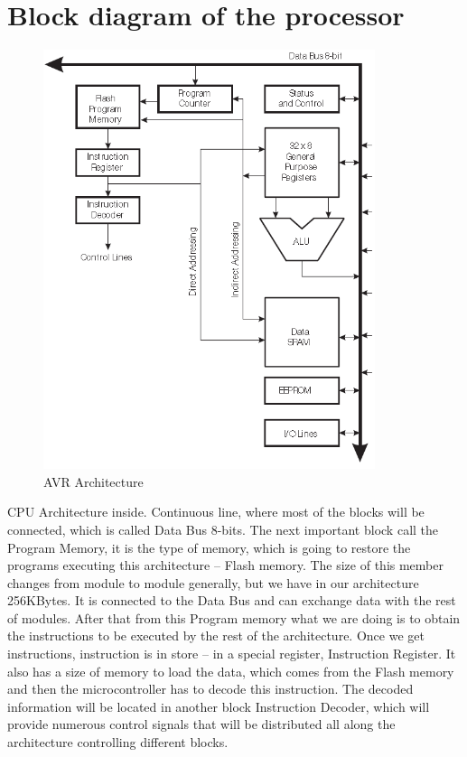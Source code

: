 \documentclass[english]{article}
\begin{document}
\section{Block diagram of the processor}
\begin{figure}[H]
\centerline{\includegraphics[scale=0.8]{MicroLab1/pictures/1}}
\caption{AVR Architecture}
\end{figure}
CPU Architecture inside. Continuous line, where most of the blocks will be connected, which is called Data Bus 8-bits. The next important block call the Program Memory, it is the type of memory, which is going to restore the programs executing this architecture – Flash memory. The size of this member changes from module to module generally, but we have in our architecture 256KBytes. It is connected to the Data Bus and can exchange data with the rest of modules. After that from this Program memory what we are doing is to obtain the instructions to be executed by the rest of the architecture. Once we get instructions, instruction is in store – in a special register, Instruction Register. It also has a size of memory to load the data, which comes from the Flash memory and then the microcontroller has to decode this instruction. The decoded information will be located in another block Instruction Decoder, which will provide numerous control signals that will be distributed all along the architecture controlling different blocks.\\\\
\end{document}
